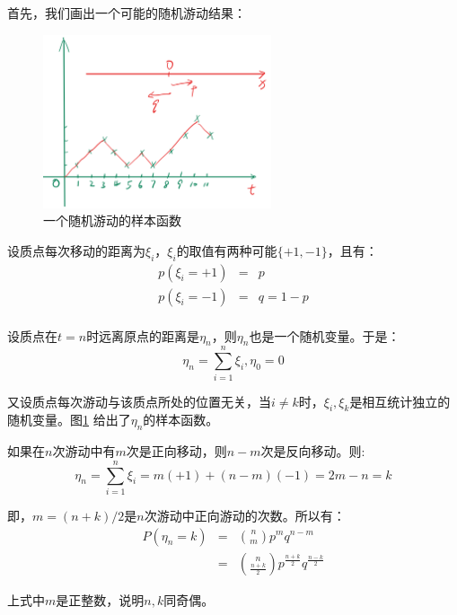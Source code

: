 \documentclass[10pt,a4paper,UTF8]{article}
\begin{document}
\begin{answer}
首先，我们画出一个可能的随机游动结果：

\begin{figure}[htbp]
\centering
\includegraphics[width=0.6\textwidth]{../../img/math_stochastic/20170418stochastic-one-way-random-walk.png}
\caption{\label{fig:orgf05f2c5}
一个随机游动的样本函数}
\end{figure}

设质点每次移动的距离为\(\xi_{i}\)，\(\xi_{i}\)的取值有两种可能\(\{+1,-1\}\)，且有：
\begin{eqnarray}
\label{eq:4}
p(\xi_{i} = +1)&=& p \\
p(\xi_{i} = -1)&=& q = 1-p \\
\end{eqnarray}

设质点在\(t=n\)时远离原点的距离是\(\eta_{n}\)，则\(\eta_{n}\)也是一个随机变量。于是：
\begin{equation}
\label{eq:1}
\eta_{n} = \sum_{i=1}^{n}\xi_{i},\eta_{0} = 0
\end{equation}

又设质点每次游动与该质点所处的位置无关，当\(i\neq k\)时，\(\xi_{i},\xi_{k}\)是相互统计独立的随机变量。图\ref{fig:orgf05f2c5} 给出了\(\eta_{n}\)的样本函数。

如果在\(n\)次游动中有\(m\)次是正向移动，则\(n-m\)次是反向移动。则:
\begin{equation}
\label{eq:2}
\eta_{n} = \sum_{i=1}^{n}\xi_{i} = m(+1) + (n-m)(-1) = 2m -n = k
\end{equation}

即，\(m = (n+k)/2\)是\(n\)次游动中正向游动的次数。所以有：
\begin{eqnarray}
\label{eq:3}
P(\eta_{n} = k)&=&\binom{n}{m}p^{m}q^{n-m} \\
&=& \binom{n}{\frac{n+k}{2}}p^{\frac{n+k}{2}}q^{\frac{n-k}{2}}
\end{eqnarray}

上式中\(m\)是正整数，说明\(n,k\)同奇偶。
\end{answer}
\end{document}
